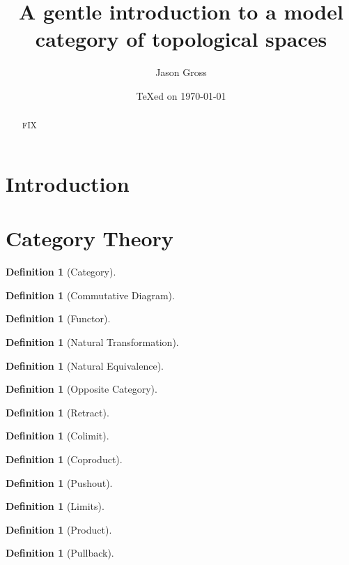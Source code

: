 \documentclass{amsart}
\theoremstyle{definition} \newtheorem{defn}[thm]{Definition}
\theoremstyle{definition} \newtheorem*{defn*}{Definition}
\theoremstyle{definition} \newtheorem{xca}[thm]{Exercise}
\theoremstyle{definition} \newtheorem{remark}[thm]{Remark}
\begin{document}
\title{A gentle introduction to a model category of topological spaces}
\author[J. Gross]{Jason Gross}
\address{Massachusetts Institute of Technology}
\date{\TeX ed on \today}

\begin{abstract}
  FIX
\end{abstract}

\maketitle

\section{Introduction}

\section{Category Theory}
  \begin{defn}[Category]
  \end{defn}
  \begin{defn}[Commutative Diagram]
  \end{defn}
  \begin{defn}[Functor]
  \end{defn}
  \begin{defn}[Natural Transformation]
  \end{defn}
  \begin{defn}[Natural Equivalence]
  \end{defn}  
  \begin{defn}[Opposite Category]
  \end{defn}
  \begin{defn}[Retract] %
  \end{defn}
  \begin{defn}[Colimit] %
  \end{defn}
  \begin{defn}[Coproduct]
  \end{defn}
  \begin{defn}[Pushout]
  \end{defn}
  \begin{defn}[Limits] %
  \end{defn}
  \begin{defn}[Product]
  \end{defn}
  \begin{defn}[Pullback]
  \end{defn}
\end{document}
